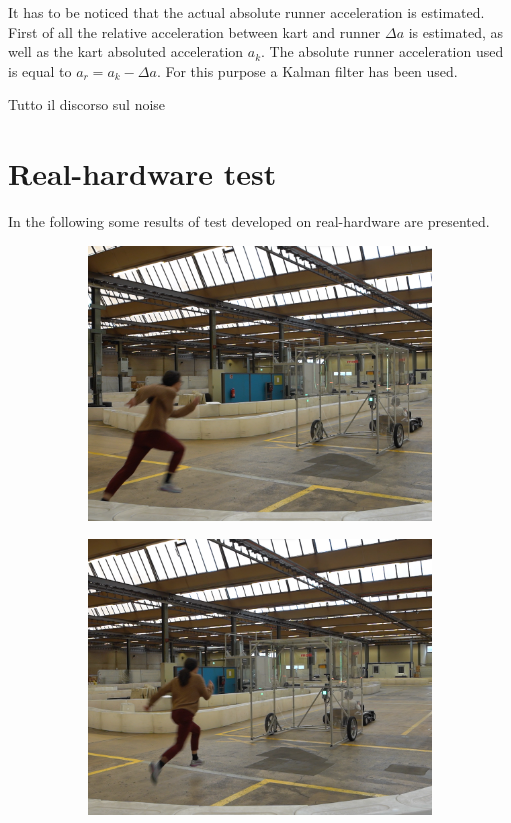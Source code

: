 \documentclass[a4paper,12pt,oneside]{book}
\begin{document}
It has to be noticed that the actual absolute runner acceleration is estimated. 
First of all the relative acceleration between kart and runner $\Delta a$ is estimated, as well as the kart absoluted acceleration $a_k$.
The absolute runner acceleration used is equal to $a_r = a_k - \Delta a$.
For this purpose a Kalman filter has been used.

Tutto il discorso sul noise

\section{Real-hardware test}
In the following some results of test developed on real-hardware are presented.

\begin{figure}[h!]
    \centering
    \begin{subfigure}[b]{0.24\textwidth}
        \includegraphics[width=\textwidth]{Catch/Catch1.png}
    \end{subfigure}
\hfill
    \begin{subfigure}[b]{0.24\textwidth}
        \includegraphics[width=\textwidth]{Catch/Catch2.png}

\end{subfigure}
\end{figure}
\end{document}
